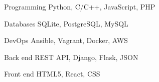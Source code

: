 

\begin{cvskills}

  \cvskill
    {Programming} %
    {Python, C/C++, JavaScript, PHP} %

  \cvskill
    {Databases} %
    {SQLite, PostgreSQL, MySQL} %

  \cvskill
    {DevOps} %
    {Ansible, Vagrant, Docker, AWS} %

  \cvskill
    {Back end} %
    {REST API, Django, Flask, JSON} %

  \cvskill
    {Front end} %
    {HTML5, React, CSS} %


\end{cvskills}
